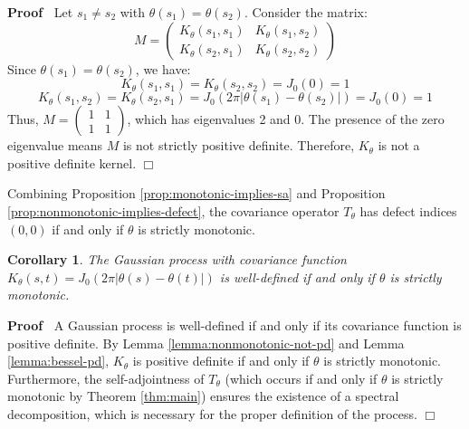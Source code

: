 \documentclass{article}
\newenvironment{proof}{\noindent\textbf{Proof\ }}{\hspace*{\fill}$\Box$\medskip}
\newtheorem{corollary}{Corollary}
\begin{document}
\begin{proof}
  Let $s_1 \neq s_2$ with $\theta (s_1) = \theta (s_2)$. Consider the matrix:
  \begin{equation}
    M = \left(\begin{array}{cc}
      K_{\theta} (s_1, s_1) & K_{\theta} (s_1, s_2)\\
      K_{\theta} (s_2, s_1) & K_{\theta} (s_2, s_2)
    \end{array}\right)
  \end{equation}
  Since $\theta (s_1) = \theta (s_2)$, we have:
  \begin{equation}
    K_{\theta} (s_1, s_1) = K_{\theta} (s_2, s_2) = J_0 (0) = 1
  \end{equation}
  \begin{equation}
    K_{\theta} (s_1, s_2) = K_{\theta} (s_2, s_1) = J_0  (2 \pi | \theta (s_1)
    - \theta (s_2) |) = J_0 (0) = 1
  \end{equation}
  Thus, $M = \left(\begin{array}{cc}
    1 & 1\\
    1 & 1
  \end{array}\right)$, which has eigenvalues 2 and 0. The presence of the zero
  eigenvalue means $M$ is not strictly positive definite. Therefore,
  $K_{\theta}$ is not a positive definite kernel.
\end{proof}

Combining Proposition \ref{prop:monotonic-implies-sa} and Proposition
\ref{prop:nonmonotonic-implies-defect}, the covariance operator $T_{\theta}$
has defect indices $(0, 0)$ if and only if $\theta$ is strictly monotonic.

\begin{corollary}
  The Gaussian process with covariance function $K_{\theta} (s, t) = J_0  (2
  \pi | \theta (s) - \theta (t) |)$ is well-defined if and only if $\theta$ is
  strictly monotonic.
\end{corollary}

\begin{proof}
  A Gaussian process is well-defined if and only if its covariance function is
  positive definite. By Lemma \ref{lemma:nonmonotonic-not-pd} and Lemma
  \ref{lemma:bessel-pd}, $K_{\theta}$ is positive definite if and only if
  $\theta$ is strictly monotonic. Furthermore, the self-adjointness of
  $T_{\theta}$ (which occurs if and only if $\theta$ is strictly monotonic by
  Theorem \ref{thm:main}) ensures the existence of a spectral decomposition,
  which is necessary for the proper definition of the process.
\end{proof}
\end{document}
